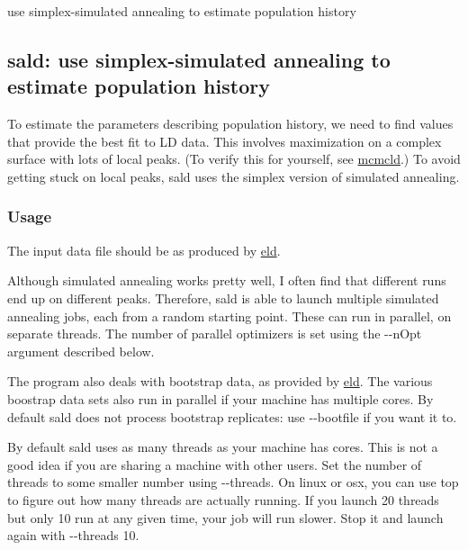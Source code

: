 use simplex-\/simulated annealing to estimate population history

\label{sald_sald}%
\hypertarget{sald_sald}{}%
\subsection*{{\ttfamily sald}\+: use simplex-\/simulated annealing to estimate population history }

To estimate the parameters describing population history, we need to find values that provide the best fit to L\+D data. This involves maximization on a complex surface with lots of local peaks. (To verify this for yourself, see \hyperlink{mcmcld_mcmcld}{mcmcld}.) To avoid getting stuck on local peaks, {\ttfamily sald} uses the simplex version of simulated annealing.

\subsubsection*{Usage }

The input data file should be as produced by \hyperlink{eld}{eld}.

Although simulated annealing works pretty well, I often find that different runs end up on different peaks. Therefore, {\ttfamily sald} is able to launch multiple simulated annealing jobs, each from a random starting point. These can run in parallel, on separate threads. The number of parallel optimizers is set using the {\ttfamily -\/-\/n\+Opt} argument described below.

The program also deals with bootstrap data, as provided by \hyperlink{eld}{eld}. The various boostrap data sets also run in parallel if your machine has multiple cores. By default {\ttfamily sald} does not process bootstrap replicates\+: use {\ttfamily -\/-\/bootfile} if you want it to.

By default {\ttfamily sald} uses as many threads as your machine has cores. This is not a good idea if you are sharing a machine with other users. Set the number of threads to some smaller number using {\ttfamily -\/-\/threads}. On linux or osx, you can use {\ttfamily top} to figure out how many threads are actually running. If you launch 20 threads but only 10 run at any given time, your job will run slower. Stop it and launch again with {\ttfamily -\/-\/threads 10}.

